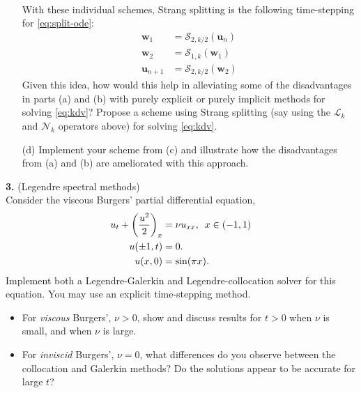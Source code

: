 \documentclass[11pt]{amsart}
\newcommand{\bs}[1]{\boldsymbol{#1}}
\begin{document}
\begin{itemize}
\begin{align*}
      \end{align*}
      With these individual schemes, Strang splitting is the following time-stepping for \eqref{eq:split-ode}:
      \begin{align*}
        \bs{w}_1 &= \mathcal{S}_{2,k/2} (\bs{u}_n) \\
        \bs{w}_2 &= \mathcal{S}_{1,k} (\bs{w}_1) \\
        \bs{u}_{n+1} &= \mathcal{S}_{2,k/2} (\bs{w}_2)
      \end{align*}
      Given this idea, how would this help in alleviating some of the disadvantages in parts (a) and (b) with purely explicit or purely implicit methods for solving \eqref{eq:kdv}? Propose a scheme using Strang splitting (say using the $\mathcal{L}_k$ and $\mathcal{N}_k$ operators above) for solving \eqref{eq:kdv}.
    \item[(d)] Implement your scheme from (c) and illustrate how the disadvantages from (a) and (b) are ameliorated with this approach.
  \end{itemize}


\textbf{3.} (Legendre spectral methods)\\
Consider the viscous Burgers' partial differential equation,
  {\begin{align*}
      u_t + \left(\frac{u^2}{2}\right)_x &= \nu u_{x x}, \hskip 5pt x \in (-1,1)\\
      u(\pm 1, t) &= 0. \\
      u(x,0) &= \sin (\pi x).
  \end{align*}}
  Implement both a Legendre-Galerkin and Legendre-collocation solver for this equation. You may use an explicit time-stepping method.
  \begin{itemize}
    \item For \textit{viscous} Burgers', $\nu > 0$, show and discuss results for $t > 0$ when $\nu$ is small, and when $\nu$ is large.
    \item For \textit{inviscid} Burgers', $\nu = 0$, what differences do you observe between the collocation and Galerkin methods? Do the solutions appear to be accurate for large $t$?
  \end{itemize}
\end{document}

